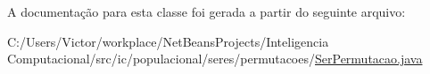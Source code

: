 A documentação para esta classe foi gerada a partir do seguinte arquivo\-:\begin{DoxyCompactItemize}
\item 
C\-:/\-Users/\-Victor/workplace/\-Net\-Beans\-Projects/\-Inteligencia Computacional/src/ic/populacional/seres/permutacoes/\hyperlink{_ser_permutacao_8java}{Ser\-Permutacao.\-java}\end{DoxyCompactItemize}

